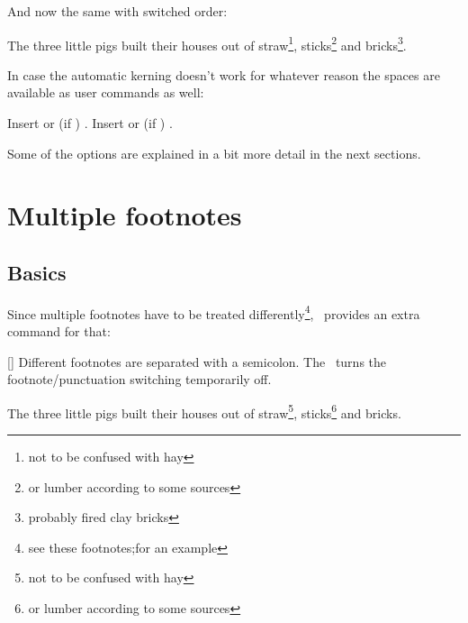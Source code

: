 \documentclass[load-preamble+]{cnltx-doc}
\begin{document}
And now the same with switched order:
\begin{example}
  \begin{minipage}{.4\linewidth}
    \noindent The three little pigs built their houses
    out of straw\footnote{not to be confused with hay},
    sticks\footnote{or lumber according to some sources}
    and bricks\footnote{probably fired clay bricks}.
  \end{minipage}
\end{example}

In case the automatic kerning doesn't work for whatever reason the spaces are
available as user commands as well:
\begin{commands}
    Insert  or (if )
    . 
    Insert  or (if )
    .
\end{commands}

Some of the options are explained in a bit more detail in the next sections.

\section{Multiple footnotes}\label{sec:multiple}
\subsection{Basics}
Since multiple footnotes have to be treated differently\footnote{see these
  footnotes;for an example}, \fnpct\ provides an extra command for that:
\begin{commands}
  [\sarg{}]
    Different footnotes are separated with a semicolon.  The \sarg\ turns the
    footnote/punctuation switching temporarily off.
\end{commands}
\begin{example}
  \begin{minipage}{.4\linewidth}
    \noindent The three little pigs built their houses
    out of straw\footnote{not to be confused with hay},
    sticks\footnote{or lumber according to some sources}
    and bricks.
  \end{minipage}
\end{example}
\end{document}
